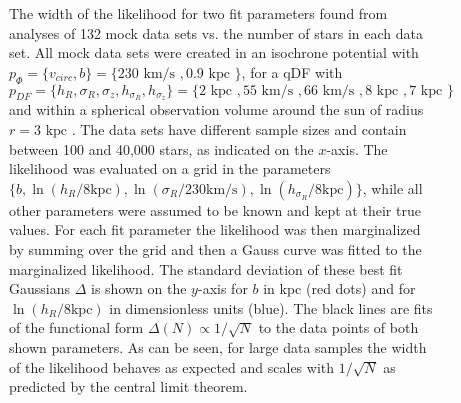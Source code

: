 \documentclass[12pt,preprint]{aastex}
\begin{document}

\begin{figure}
\caption{The width of the likelihood for two fit parameters found from analyses of 132 mock data sets vs. the number of stars in each data set. All mock data sets were created in an isochrone potential with $p_\Phi = \{v_{circ},b \}=\{230 \text{ km/s },0.9\text{ kpc } \}$, for a qDF with $p_{DF} = \{ h_R, \sigma_R, \sigma_z,h_{\sigma_R},h_{\sigma_z}\} =\{2 \text{ kpc }, 55 \text{ km/s }, 66 \text{ km/s }, 8 \text{ kpc }, 7 \text{ kpc }\} $ and within a spherical observation volume around the sun of radius $r = 3 \text{ kpc }$. The data sets have different sample sizes and contain between 100 and 40,000 stars, as indicated on the $x$-axis. The likelihood was evaluated on a grid in the parameters $\{b,\ln(h_R/8\text{kpc}),\ln(\sigma_{R}/230 \text{km/s}),\ln(h_{\sigma_R}/8\text{kpc}) \}$, while all other parameters were assumed to be known and kept at their true values. For each fit parameter the likelihood was then marginalized by summing over the grid and then a Gauss curve was fitted to the marginalized likelihood. The standard deviation of these best fit Gaussians $\Delta$ is shown on the $y$-axis for $b$ in kpc (red dots) and for $\ln(h_R/8\text{kpc})$ in dimensionless units (blue). The black lines are fits of the functional form $\Delta(N) \propto 1/\sqrt{N}$ to the data points  of both shown parameters. As can be seen, for large data samples the width of the likelihood behaves as expected and scales with $1/\sqrt{N}$ as predicted by the central limit theorem.} 
\end{figure}

\end{document}
